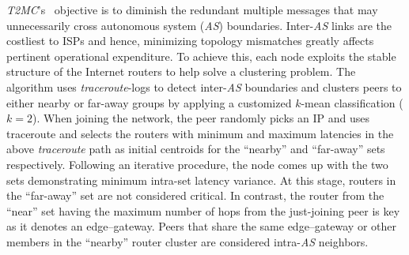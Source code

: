 \emph{T2MC}'s~\cite{SLCGZ2008} objective is to diminish the redundant multiple
messages that may unnecessarily cross autonomous system (\emph{AS}) boundaries.
Inter-\emph{AS} links are the costliest to ISPs and hence, 
minimizing topology mismatches greatly affects pertinent operational expenditure.
To achieve this, each node exploits the stable structure of
the Internet routers to help solve a clustering problem. 
The algorithm uses {\sl traceroute}-logs to detect inter-\emph{AS} boundaries 
and clusters peers to either nearby or 
far-away groups by applying a customized $k$-mean classification ($k=2$).
When joining the network, the peer randomly picks an IP and uses
traceroute and selects the routers with
minimum and maximum latencies in the above {\sl traceroute} path 
as initial centroids for the ``nearby'' and ``far-away'' sets respectively.
Following an iterative procedure, the node comes up with the two sets 
demonstrating minimum intra-set latency variance.
At this stage, routers in the ``far-away'' set are not considered critical.
% 
% 
In contrast, the router from the ``near'' set
having the maximum number of hops 
from the just-joining peer is key as it denotes an edge--gateway. 
Peers that share the same edge--gateway or other members in the ``nearby'' 
router cluster are considered intra-\emph{AS} neighbors.

